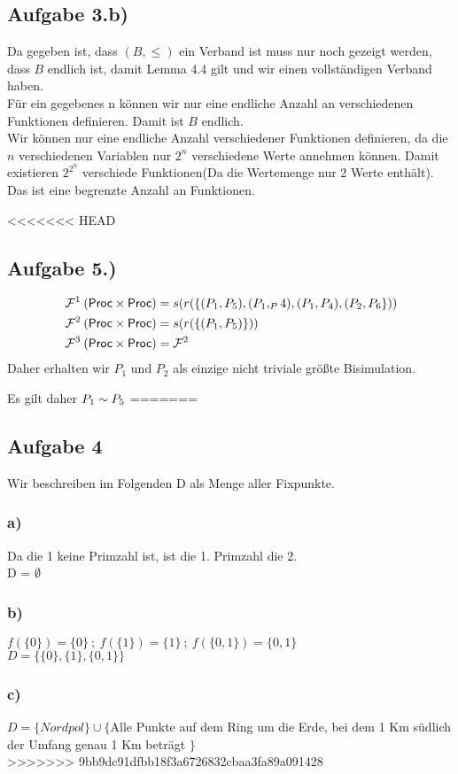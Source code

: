\documentclass[10pt,a4paper,german,landscape,fleqn]{article} \usepackage[utf8]{inputenc} %
\begin{document}
\subsection*{Aufgabe 3.b)}
Da gegeben ist, dass $(B,\le)$ ein Verband ist muss nur noch gezeigt werden, dass
$B$ endlich ist, damit Lemma 4.4 gilt und wir einen vollständigen Verband haben. \\
Für ein gegebenes n können wir nur eine endliche Anzahl an verschiedenen Funktionen definieren. Damit ist $B$ endlich. \\
Wir können nur eine endliche Anzahl verschiedener Funktionen definieren, da die $n$ verschiedenen Variablen nur $2^n$ verschiedene Werte annehmen können. Damit existieren $2^{2^n}$ verschiede Funktionen(Da die Wertemenge nur 2 Werte enthält). Das ist eine begrenzte Anzahl an Funktionen.
\newpage

<<<<<<< HEAD
\subsection*{Aufgabe 5.)}
\begin{align}
&\mathbin{\mathcal{F}}^1(\mbox{\sf Proc} \times \mbox{\sf Proc}) = s(r(\{(P_1,P_5),(P_1,_P4),(P_1,P_4),(P_2,P_6\})) \\
&\mathbin{\mathcal{F}}^2(\mbox{\sf Proc} \times \mbox{\sf Proc}) = s(r(\{(P_1,P_5)\})) \\
&\mathbin{\mathcal{F}}^3(\mbox{\sf Proc} \times \mbox{\sf Proc}) = \mathbin{\mathcal{F}}^2 \\
\end{align}
Daher erhalten wir $P_1$ und $P_2$ als einzige nicht triviale größte Bisimulation.

Es gilt daher $P_1 \sim P_5$
=======

\subsection*{Aufgabe 4}
Wir beschreiben im Folgenden D als Menge aller Fixpunkte.
\subsubsection*{a)}
Da die 1 keine Primzahl ist, ist die 1. Primzahl die 2.\\
D = $\emptyset$
\subsubsection*{b)}
$f(\{0\})=\{0\} \ ; \ f(\{1\})=\{1\} \ ; \ f(\{0,1\})=\{0,1\}$\\
$D=\{ \{0\},\{1\},\{0,1\}\}$\\
\subsubsection*{c)}
$D=\{Nordpol\} \cup \{$Alle Punkte auf dem Ring um die Erde, bei dem 1 Km südlich der Umfang genau 1 Km beträgt $\} $\\
>>>>>>> 9bb9dc91dfbb18f3a6726832cbaa3fa89a091428
\end{document}
